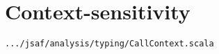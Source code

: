 %




\newpage
\section{Context-sensitivity}\label{sec:context-sensitivity}
{\inblue\tt .../jsaf/analysis/typing/CallContext.scala}\\

